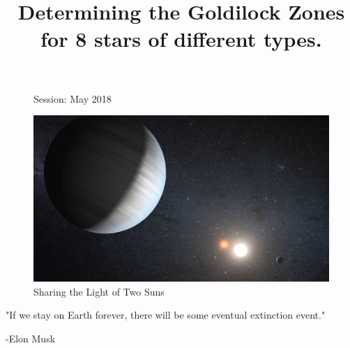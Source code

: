 \documentclass[a4paper]{IEEEtran}
\title{Determining the Goldilock Zones for 8 stars of different types.}
\date{}
\author{}
\begin{document}
\maketitle
\tableofcontents

\begin{figure}
  \begin{flushleft}
    Session: May 2018\\
    \end{flushleft}
  \end{figure}


  \begin{figure}[b!]
\begin{center}
    \includegraphics[width=\textwidth]{kepler.jpg}
     \caption{Sharing the Light of Two Suns \cite{kepler}}
\end{center}
   
  \end{figure}

\newpage
{}

\begin{center}
  "If we stay on Earth forever, there will be some eventual extinction event." 
  \end{center}
\begin{flushright}
  -Elon Musk \cite{musk}
\end{flushright}
\end{document}
